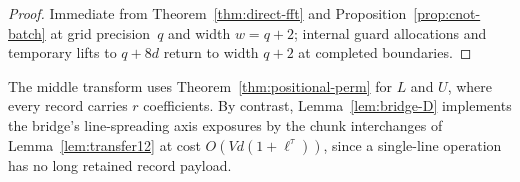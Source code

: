 \begin{proof}
Immediate from Theorem~\ref{thm:direct-fft} and Proposition~\ref{prop:cnot-batch} at grid precision~$q$ and width
$w=q+2$; internal guard allocations and temporary lifts to $q+8d$ return to width $q+2$ at completed boundaries.
\end{proof}

The middle transform uses Theorem~\ref{thm:positional-perm} for $L$ and $U$, where every record carries $r$
coefficients. By contrast, Lemma~\ref{lem:bridge-D} implements the bridge's line-spreading axis exposures by the chunk
interchanges of Lemma~\ref{lem:transfer12} at cost $O(Vd(1+\ell^\tau))$, since a single-line operation has no long
retained record payload.
